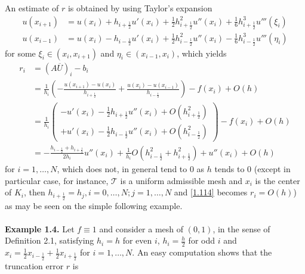 \documentclass[a4paper]{article}
\numberwithin{equation}{section}
\begin{document}
An estimate of $r$ is obtained by using Taylor's expansion
\begin{align}
u\left( {{x_{i + 1}}} \right) &= u\left( {{x_i}} \right) + {h_{i + \frac{1}{2}}}u'\left( {{x_i}} \right) + \frac{1}{2}h_{i + \frac{1}{2}}^2u''\left( {{x_i}} \right) + \frac{1}{6}h_{i + \frac{1}{2}}^3u'''\left( {{\xi _i}} \right)\\
u\left( {{x_{i - 1}}} \right) &= u\left( {{x_i}} \right) - {h_{i - \frac{1}{2}}}u'\left( {{x_i}} \right) + \frac{1}{2}h_{i - \frac{1}{2}}^2u''\left( {{x_i}} \right) - \frac{1}{6}h_{i - \frac{1}{2}}^3u'''\left( {{\eta _i}} \right)
\end{align}
for some ${\xi _i} \in \left( {{x_i},{x_{i + 1}}} \right)$ and ${\eta _i} \in \left( {{x_{i - 1}},{x_i}} \right)$, which yields
\begin{align}
{r_i} &= {\left( {A\overline U } \right)_i} - {b_i}\\
 &= \frac{1}{{{h_i}}}\left( { - \frac{{u\left( {{x_{i + 1}}} \right) - u\left( {{x_i}} \right)}}{{{h_{i + \frac{1}{2}}}}} + \frac{{u\left( {{x_i}} \right) - u\left( {{x_{i - 1}}} \right)}}{{{h_{i - \frac{1}{2}}}}}} \right) - f\left( {{x_i}} \right) + O\left( h \right)\\
& = \frac{1}{{{h_i}}}\left( \begin{array}{l}
 - u'\left( {{x_i}} \right) - \frac{1}{2}{h_{i + \frac{1}{2}}}u''\left( {{x_i}} \right) + O\left( {h_{i + \frac{1}{2}}^2} \right)\\
 + u'\left( {{x_i}} \right) - \frac{1}{2}{h_{i - \frac{1}{2}}}u''\left( {{x_i}} \right) + O\left( {h_{i - \frac{1}{2}}^2} \right)
\end{array} \right) - f\left( {{x_i}} \right) + O\left( h \right)\\
 &=  - \frac{{{h_{i - \frac{1}{2}}} + {h_{i + \frac{1}{2}}}}}{{2{h_i}}}u''\left( {{x_i}} \right) + \frac{1}{{{h_i}}}O\left( {h_{i - \frac{1}{2}}^2 + h_{i + \frac{1}{2}}^2} \right) + u''\left( {{x_i}} \right) + O\left( h \right) \label{1.114}
\end{align}
for $i = 1, \ldots ,N$, which does not, in general tend to 0 as $h$ tends to 0 (except in particular case, for instance, $\mathcal{T}$ is a uniform admissible mesh and $x_i$ is the center of $K_i$, then ${h_{i + \frac{1}{2}}} = {h_j},i = 0, \ldots ,N;j = 1, \ldots ,N$ and \eqref{1.114} becomes ${r_i} = O\left( h \right)$) as may be seen on the simple following example.\\
\\
\textbf{Example 1.4.} Let $f \equiv 1$ and consider a mesh of $\left(0,1\right)$, in the sense of Definition 2.1, satisfying $h_i=h$ for even $i$, $h_i=\frac{h}{2}$ for odd $i$ and ${x_i} = \frac{1}{2}{x_{i - \frac{1}{2}}} + \frac{1}{2}{x_{i + \frac{1}{2}}}$ for $i=1,\ldots,N$. An easy computation shows that the truncation error $r$ is 
\end{document}
